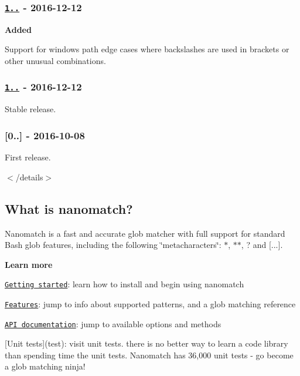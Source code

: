 \subsubsection*{\href{https://github.com/micromatch/nanomatch/compare/1.0.0...1.0.1}{\tt 1..} -\/ 2016-\/12-\/12}

{\bfseries Added}


\begin{DoxyItemize}
\item Support for windows path edge cases where backslashes are used in brackets or other unusual combinations.
\end{DoxyItemize}

\subsubsection*{\href{https://github.com/micromatch/nanomatch/compare/0.1.0...1.0.0}{\tt 1..} -\/ 2016-\/12-\/12}

Stable release.

\subsubsection*{\mbox{[}0..\mbox{]} -\/ 2016-\/10-\/08}

First release.

$<$/details$>$

\subsection*{What is nanomatch?}

Nanomatch is a fast and accurate glob matcher with full support for standard Bash glob features, including the following \char`\"{}metacharacters\char`\"{}\+: {\ttfamily $\ast$}, {\ttfamily $\ast$$\ast$}, {\ttfamily ?} and {\ttfamily \mbox{[}...\mbox{]}}.

{\bfseries Learn more}


\begin{DoxyItemize}
\item \href{#getting-started}{\tt Getting started}\+: learn how to install and begin using nanomatch
\item \href{#features}{\tt Features}\+: jump to info about supported patterns, and a glob matching reference
\item \href{#api}{\tt A\+PI documentation}\+: jump to available options and methods
\item \mbox{[}Unit tests\mbox{]}(test)\+: visit unit tests. there is no better way to learn a code library than spending time the unit tests. Nanomatch has 36,000 unit tests -\/ go become a glob matching ninja!
\end{DoxyItemize}

